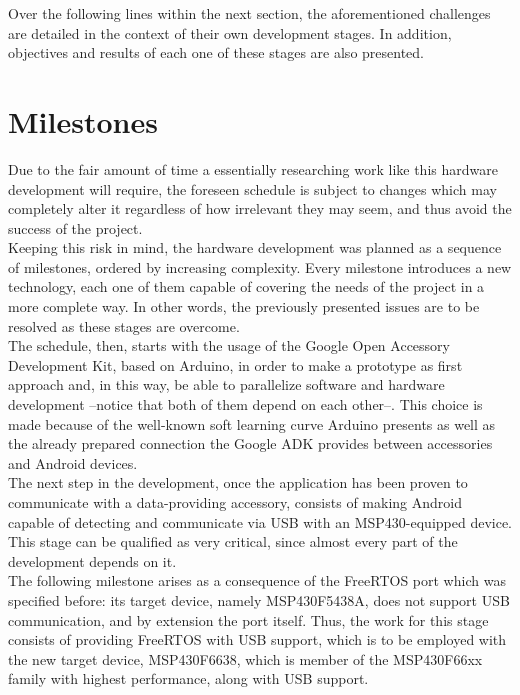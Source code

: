 	Over the following lines within the next section, the aforementioned challenges are detailed
	in the context of their own development stages. In addition, objectives and results of each one of
	these stages are also presented.
	
	\section{Milestones}
	\label{sec:hw-mstones}
	Due to the fair amount of time a essentially researching work like this hardware development will
	require, the foreseen schedule is subject to changes which may completely alter it regardless of 
	how irrelevant they may seem, and thus avoid the success of the project.\\
	
	Keeping this risk in mind, the hardware development was planned as a sequence of milestones,
	ordered by increasing complexity. Every milestone introduces a new technology, each one of them
	capable of covering the needs of the project in a more complete way. In other words, the previously
	presented issues are to be resolved as these stages are overcome.\\
	
	The schedule, then, starts with the usage of the Google Open Accessory Development Kit, based on Arduino,
	in order to make a prototype as first approach and, in this way, be able to parallelize software and
	hardware development --notice that both of them depend on each other--. This choice is made because of
	the well-known soft learning curve Arduino presents as well as the already prepared connection
	the Google ADK provides between accessories and Android devices.\\
	
	The next step in the development, once the application has been proven to communicate with a data-providing
	accessory, consists of making Android capable of detecting and communicate via USB with an MSP430-equipped
	device. This stage can be qualified as very critical, since almost every part of the development
	depends on it.\\
	
	The following milestone arises as a consequence of the FreeRTOS port which was specified before: its
	target device, namely MSP430F5438A, does not support USB communication, and by extension the port itself.
	Thus, the work for this stage consists of providing FreeRTOS with USB support, which is to be employed
	with the new target device, MSP430F6638, which is member of the MSP430F66xx family with highest performance,
	along with USB support.\\
	
